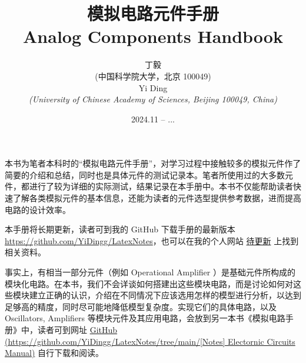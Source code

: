 \documentclass[UTF8]{report}
\title{模拟电路元件手册\\ Analog Components Handbook}
\author{丁毅\\ \footnotesize {\kaishu (中国科学院大学，北京 100049)} \\ Yi Ding \\ \footnotesize \textit{(University of Chinese Academy of Sciences, Beijing 100049, China)}}
\date{\footnotesize 2024.11 -- ...}
\begin{document}
 

    \maketitle\newpage  
    \thispagestyle{fancy}   %

\begin{cnabstract}\normalsize 
本书为笔者本科时的“模拟电路元件手册”，对学习过程中接触较多的模拟元件作了简要的介绍和总结，同时也是具体元件的测试记录本。笔者所使用过的大多数元件，都进行了较为详细的实际测试，结果记录在本手册中。本书不仅能帮助读者快速了解各类模拟元件的基本信息，还能为读者的元件选型提供参考数据，进而提高电路的设计效率。

本手册将长期更新，读者可到我的 GitHub 下载手册的最新版本 \href{https://github.com/YiDingg/LatexNotes}{https://github.com/YiDingg/LatexNotes}，也可以在我的个人网站 \href{URL}{待更新} 上找到相关资料。

事实上，有相当一部分元件（例如 Operational Amplifier ）是基础元件所构成的模块化电路。在本书，我们不会详谈如何搭建出这些模块电路，而是讨论如何对这些模块建立正确的认识，介绍在不同情况下应该选用怎样的模型进行分析，以达到足够高的精度，同时尽可能地降低模型复杂度。实现它们的具体电路，以及 Oscillators, Amplifiers 等模块元件及其应用电路，会放到另一本书{\kaishu 《模拟电路手册》}中，读者可到网址 \href{https://github.com/YiDingg/LatexNotes/tree/main/%5BNotes%5D%20Electornic%20Circuits%20Manual}{GitHub {\color{black} (https://github.com/YiDingg/LatexNotes/tree/main/[Notes] Electornic Circuits Manual)}} 自行下载和阅读。



\end{cnabstract}
\end{document}
